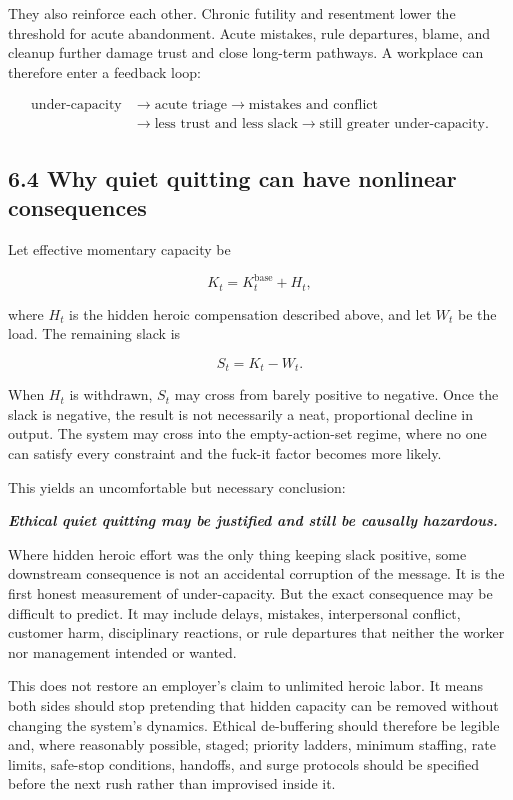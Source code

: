 \documentclass[11pt,oneside]{article}
\renewenvironment{quote}
  {\begin{tcolorbox}[
      enhanced,
      breakable,
      colback=ManifestLight,
      colframe=ManifestRule,
      boxrule=0pt,
      leftrule=3pt,
      arc=0pt,
      outer arc=0pt,
      left=10pt,right=10pt,top=8pt,bottom=8pt,
      before skip=0.8em,after skip=0.8em
    ]\itshape}
  {\end{tcolorbox}}
\begin{document}
They also reinforce each other. Chronic futility and resentment lower
the threshold for acute abandonment. Acute mistakes, rule departures,
blame, and cleanup further damage trust and close long-term pathways. A
workplace can therefore enter a feedback loop:

\[
\begin{aligned}
\text{under-capacity}
&\rightarrow
\text{acute triage}
\rightarrow
\text{mistakes and conflict}
\\
&\rightarrow
\text{less trust and less slack}
\rightarrow
\text{still greater under-capacity}.
\end{aligned}
\]

\subsection{6.4 Why quiet quitting can have nonlinear
consequences}\label{why-quiet-quitting-can-have-nonlinear-consequences}

Let effective momentary capacity be

\[
K_t = K_t^{\mathrm{base}} + H_t,
\]

where \(H_t\) is the hidden heroic compensation described above, and let
\(W_t\) be the load. The remaining slack is

\[
S_t = K_t - W_t.
\]

When \(H_t\) is withdrawn, \(S_t\) may cross from barely positive to
negative. Once the slack is negative, the result is not necessarily a
neat, proportional decline in output. The system may cross into the
empty-action-set regime, where no one can satisfy every constraint and
the fuck-it factor becomes more likely.

This yields an uncomfortable but necessary conclusion:

\begin{quote}
\textbf{Ethical quiet quitting may be justified and still be causally
hazardous.}
\end{quote}

Where hidden heroic effort was the only thing keeping slack positive,
some downstream consequence is not an accidental corruption of the
message. It is the first honest measurement of under-capacity. But the
exact consequence may be difficult to predict. It may include delays,
mistakes, interpersonal conflict, customer harm, disciplinary reactions,
or rule departures that neither the worker nor management intended or
wanted.

This does not restore an employer's claim to unlimited heroic labor. It
means both sides should stop pretending that hidden capacity can be
removed without changing the system's dynamics. Ethical de-buffering
should therefore be legible and, where reasonably possible, staged;
priority ladders, minimum staffing, rate limits, safe-stop conditions,
handoffs, and surge protocols should be specified before the next rush
rather than improvised inside it.
\end{document}
